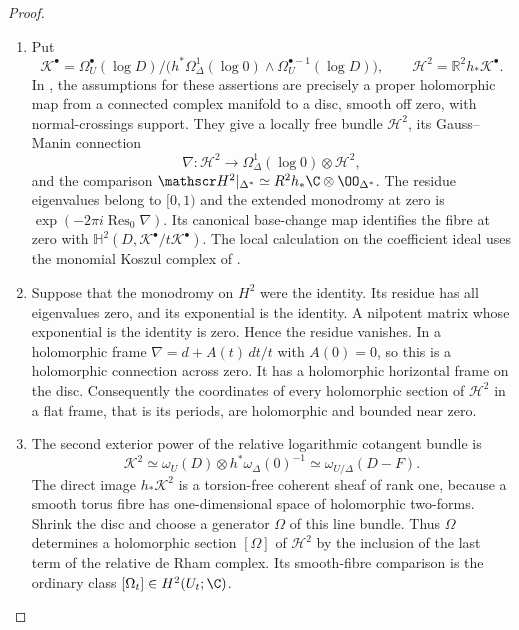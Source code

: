 \begin{proof}

\begin{enumerate}[leftmargin=*]
\item Put
\[
\mathscr K^\bullet=
 \Omega_U^\bullet(\log D)\big/
 \bigl(h^*\Omega_\Delta^1(\log0)\wedge
       \Omega_U^{\bullet-1}(\log D)\bigr),\qquad
\mathscr H^2=\mathbb R^2h_*\mathscr K^\bullet.
\]
In \cite[\S2.1, p.~234; Theorem~2.18, pp.~237--238; \S2.19 and Proposition~2.20, pp.~238--239; Theorem~2.21, p.~239]{Steenbrink1976}, the assumptions for these assertions
are precisely a proper holomorphic map from a connected complex
manifold to a disc, smooth off zero, with normal-crossings support.
They give a locally free bundle $\mathscr H^2$,
its Gauss--Manin connection
\[
\nabla:\mathscr H^2\longrightarrow
\Omega_\Delta^1(\log0)\otimes\mathscr H^2,
\]
and the comparison
$\mathscr H^2|_{\Delta^*}\simeq
R^2h_*\C\otimes\OO_{\Delta^*}$.
The residue eigenvalues belong to $[0,1)$ and the extended
monodromy at zero is
$\exp(-2\pi i\operatorname{Res}_0\nabla)$.
Its canonical base-change map identifies the fibre at zero with
$\mathbb H^2(D,\mathscr K^\bullet/t\mathscr K^\bullet)$.
The local calculation on the coefficient ideal uses the monomial
Koszul complex of \cite[Proposition~1.13, pp.~233--234, and proof of Proposition~2.20, pp.~238--239]{Steenbrink1976}.

\item Suppose that the monodromy on $H^2$ were the identity. Its
residue has all eigenvalues zero, and its exponential is the
identity. A nilpotent matrix whose exponential is the identity
is zero. Hence the residue vanishes. In a holomorphic frame
$\nabla=d+A(t)\,dt/t$ with $A(0)=0$, so this is a holomorphic
connection across zero. It has a holomorphic horizontal frame
on the disc. Consequently the coordinates of every holomorphic
section of $\mathscr H^2$ in a flat frame, that is its periods,
are holomorphic and bounded near zero.

\item The second exterior power of the relative logarithmic cotangent bundle is
\[
\mathscr K^2\simeq
 \omega_U(D)\otimes h^*\omega_\Delta(0)^{-1}
 \simeq\omega_{U/\Delta}(D-F).
\]
The direct image $h_*\mathscr K^2$ is a torsion-free
coherent sheaf of rank one, because a smooth torus fibre has
one-dimensional space of holomorphic two-forms. Shrink the disc
and choose a generator $\Omega$ of this line bundle.
Thus $\Omega$ determines a holomorphic section $[\Omega]$ of
$\mathscr H^2$ by the inclusion of the last term of the
relative de Rham complex. Its smooth-fibre comparison is the
ordinary class $[\Omega_t]\in H^2(U_t;\C)$.


\end{enumerate}
\end{proof}
